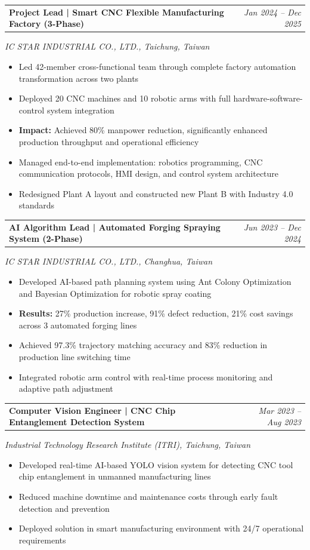 \documentclass[11pt,a4paper]{article}
\makeatletter
\newcommand{\resumeProjectHeading}[2]{
    \vspace{2pt}
    \begin{tabular*}{\textwidth}[t]{@{}l@{\extracolsep{\fill}}r@{}}
        \textbf{#1} & \textit{\small#2} \\
    \end{tabular*}\vspace{-5pt}
}
\newcommand{\resumeItem}[1]{
    \item\small{#1 \vspace{-2pt}}
}
\makeatother
\begin{document}
\vspace{4pt}

\resumeProjectHeading
{\textbf{Project Lead} | Smart CNC Flexible Manufacturing Factory (3-Phase)}{Jan 2024 -- Dec 2025}
\textit{IC STAR INDUSTRIAL CO., LTD., Taichung, Taiwan}
\vspace{2pt}
\begin{itemize}[leftmargin=*, itemsep=1pt]
    \resumeItem{Led 42-member cross-functional team through complete factory automation transformation across two plants}
    \resumeItem{Deployed 20 CNC machines and 10 robotic arms with full hardware-software-control system integration}
    \resumeItem{\textbf{Impact:} Achieved 80\% manpower reduction, significantly enhanced production throughput and operational efficiency}
    \resumeItem{Managed end-to-end implementation: robotics programming, CNC communication protocols, HMI design, and control system architecture}
    \resumeItem{Redesigned Plant A layout and constructed new Plant B with Industry 4.0 standards}
\end{itemize}

\vspace{4pt}

\resumeProjectHeading
{\textbf{AI Algorithm Lead} | Automated Forging Spraying System (2-Phase)}{Jun 2023 -- Dec 2024}
\textit{IC STAR INDUSTRIAL CO., LTD., Changhua, Taiwan}
\vspace{2pt}
\begin{itemize}[leftmargin=*, itemsep=1pt]
    \resumeItem{Developed AI-based path planning system using Ant Colony Optimization and Bayesian Optimization for robotic spray coating}
    \resumeItem{\textbf{Results:} 27\% production increase, 91\% defect reduction, 21\% cost savings across 3 automated forging lines}
    \resumeItem{Achieved 97.3\% trajectory matching accuracy and 83\% reduction in production line switching time}
    \resumeItem{Integrated robotic arm control with real-time process monitoring and adaptive path adjustment}
\end{itemize}

\vspace{4pt}

\resumeProjectHeading
{\textbf{Computer Vision Engineer} | CNC Chip Entanglement Detection System}{Mar 2023 -- Aug 2023}
\textit{Industrial Technology Research Institute (ITRI), Taichung, Taiwan}
\vspace{2pt}
\begin{itemize}[leftmargin=*, itemsep=1pt]
    \resumeItem{Developed real-time AI-based YOLO vision system for detecting CNC tool chip entanglement in unmanned manufacturing lines}
    \resumeItem{Reduced machine downtime and maintenance costs through early fault detection and prevention}
    \resumeItem{Deployed solution in smart manufacturing environment with 24/7 operational requirements}
\end{itemize}
\end{document}
